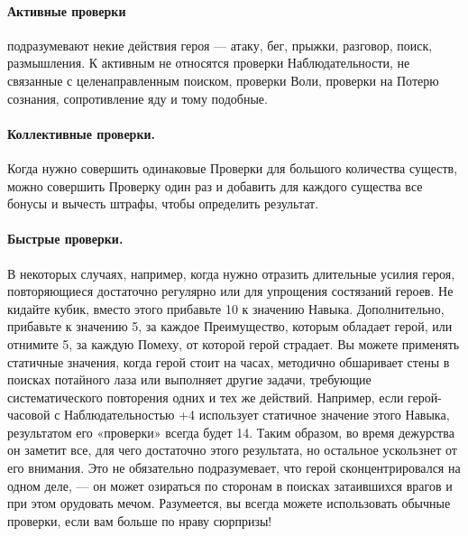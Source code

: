 \paragraph{Активные проверки} подразумевают некие действия героя — атаку, бег, прыжки, разговор, поиск, размышления. К активным не относятся проверки Наблюдательности, не связанные с целенаправленным поиском, проверки Воли, проверки на Потерю сознания, сопротивление яду и тому подобные.
{\paragraph{Коллективные проверки.} Когда нужно совершить одинаковые Проверки для большого количества существ, можно совершить Проверку один раз и добавить для каждого существа все бонусы и вычесть штрафы, чтобы определить результат.
\paragraph{Быстрые проверки.} В некоторых случаях, например, когда нужно отразить длительные усилия героя, повторяющиеся достаточно регулярно или для упрощения состязаний героев. Не кидайте кубик, вместо этого прибавьте 10 к значению Навыка. Дополнительно, прибавьте к значению 5, за каждое Преимущество, которым обладает герой, или отнимите 5, за каждую Помеху, от которой герой страдает. Вы можете применять статичные значения, когда герой стоит на часах, методично обшаривает стены в поисках потайного лаза или выполняет другие задачи, требующие систематического повторения одних и тех же действий.
\newline Например, если герой-часовой с Наблюдательностью +4 использует статичное значение этого Навыка, результатом его «проверки» всегда будет 14. Таким образом, во время дежурства он заметит все, для чего достаточно этого результата, но остальное ускользнет от его внимания. Это не обязательно подразумевает, что герой сконцентрировался на одном деле, — он может озираться по сторонам в поисках затаившихся врагов и при этом орудовать мечом. Разумеется, вы всегда можете использовать обычные проверки, если вам больше по нраву сюрпризы!
}
